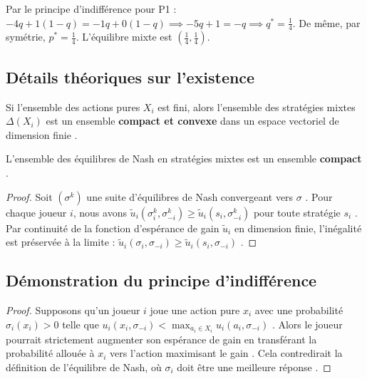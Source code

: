 Par le principe d'indifférence pour P1 :
$-4q + 1(1-q) = -1q + 0(1-q) \implies -5q + 1 = -q \implies q^* = \frac{1}{4}$.
De même, par symétrie, $p^* = \frac{1}{4}$. L'équilibre mixte est $(\frac{1}{4}, \frac{1}{4})$.

\subsection{Détails théoriques sur l'existence}

\begin{lemma}
Si l'ensemble des actions pures $X_i$ est fini, alors l'ensemble des stratégies mixtes $\Delta(X_i)$ est un ensemble \textbf{compact et convexe} dans un espace vectoriel de dimension finie \cite{Note 7 oct. 2024 (3).pdf}.
\end{lemma}

\begin{proposition}
L'ensemble des équilibres de Nash en stratégies mixtes est un ensemble \textbf{compact} \cite{Note 7 oct. 2024 (3).pdf}.
\end{proposition}

\begin{proof}
Soit $(\sigma^k)$ une suite d'équilibres de Nash convergeant vers $\sigma$ \cite{Note 7 oct. 2024 (3).pdf}. Pour chaque joueur $i$, nous avons $\tilde{u}_i(\sigma_i^k, \sigma_{-i}^k) \ge \tilde{u}_i(s_i, \sigma_{-i}^k)$ pour toute stratégie $s_i$ \cite{Note 7 oct. 2024 (3).pdf}. Par continuité de la fonction d'espérance de gain $\tilde{u}_i$ en dimension finie, l'inégalité est préservée à la limite : $\tilde{u}_i(\sigma_i, \sigma_{-i}) \ge \tilde{u}_i(s_i, \sigma_{-i})$ \cite{Note 7 oct. 2024 (3).pdf}.
\end{proof}

\subsection{Démonstration du principe d'indifférence}

\begin{proof}
Supposons qu'un joueur $i$ joue une action pure $x_i$ avec une probabilité $\sigma_i(x_i) > 0$ telle que $u_i(x_i, \sigma_{-i}) < \max_{a_i \in X_i} u_i(a_i, \sigma_{-i})$ \cite{Note 7 oct. 2024 (3).pdf}. Alors le joueur pourrait strictement augmenter son espérance de gain en transférant la probabilité allouée à $x_i$ vers l'action maximisant le gain \cite{Note 7 oct. 2024 (3).pdf}. Cela contredirait la définition de l'équilibre de Nash, où $\sigma_i$ doit être une meilleure réponse \cite{Note 7 oct. 2024 (3).pdf}.
\end{proof}

